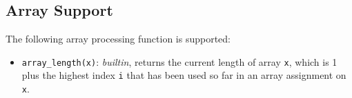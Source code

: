 \subsection*{Array Support}

The following array processing function is supported:

\begin{itemize}
\item \lstinline{array_length(x)}: \textit{builtin}, returns
  the current length of array \lstinline{x}, which is 1 plus the
highest index \lstinline{i} that has been used so far in an array assignment on \lstinline{x}.
\end{itemize}

  


